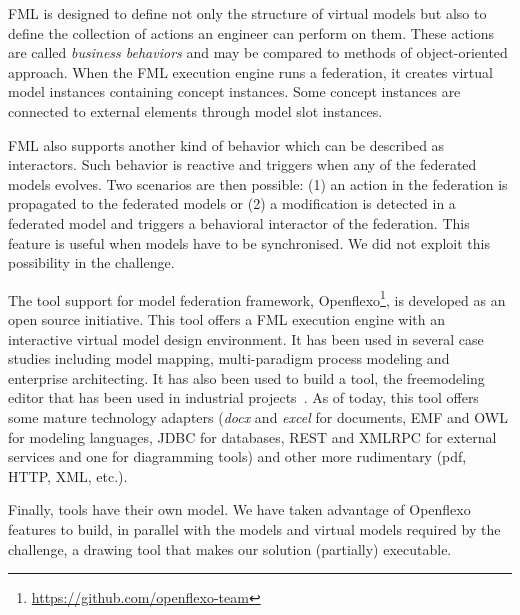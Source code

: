 FML is designed to define not only the structure of virtual models but
also to define the collection of actions an engineer can perform on
them. These actions are called \emph{business behaviors} and may be
compared to methods of object-oriented approach.
When the FML execution engine runs a federation, it creates virtual
model instances containing concept instances. Some concept instances
are connected to external elements through model slot instances.

FML also supports another kind of behavior which can be described as
interactors. Such behavior is reactive and triggers when any of the
federated models evolves. Two scenarios are then possible: (1) an
action in the federation is propagated to the federated models or (2)
a modification is detected in a federated model and triggers a
behavioral interactor of the federation.
This feature is useful when models have to be synchronised. We did not
exploit this possibility in the challenge.

The tool support for model federation framework,
Openflexo\footnote{\url{https://github.com/openflexo-team}}, is
developed as an open source initiative. This tool offers a FML
execution engine with an interactive virtual model design environment.
It has been used in several case studies including model mapping,
multi-paradigm process modeling and enterprise architecting. It has
also been used to build a tool, the freemodeling editor that has been
used in industrial projects~\cite{models2016-freemodel}. As of today, this tool
offers some mature technology adapters (\emph{docx} and \emph{excel}
for documents, EMF and OWL for modeling languages, JDBC for databases,
REST and XMLRPC for external services and one for diagramming tools)
and other more rudimentary (pdf, HTTP, XML, etc.).

Finally, tools have their own model. We have taken advantage of
Openflexo features to build, in parallel with the models and virtual
models required by the challenge, a drawing tool that makes our
solution (partially) executable.
